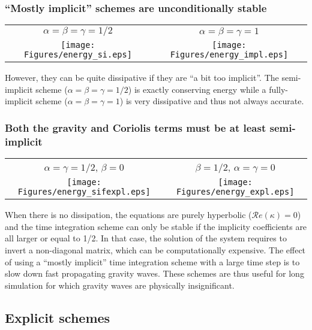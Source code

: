 \subsubsection{``Mostly implicit'' schemes are unconditionally stable}

\begin{center}
	\begin{tabular}{cc}
		$\alpha = \beta = \gamma = 1/2$  & $\alpha = \beta = \gamma = 1$ \\
		\texttt{[image: Figures/energy\_si.eps]}
		&
		\texttt{[image: Figures/energy\_impl.eps]}
	\end{tabular}
\end{center}
However, they can be quite dissipative if they are ``a bit too implicit''. The semi-implicit scheme ($\alpha = \beta = \gamma = 1/2$) is exactly conserving energy while a fully-implicit scheme ($\alpha = \beta = \gamma = 1$) is very dissipative and thus not always accurate.


\subsubsection{Both the gravity and Coriolis terms must be at least semi-implicit}

\begin{center}
	\begin{tabular}{cc}
		$\alpha = \gamma = 1/2$, $\beta=0$  & $\beta = 1/2$, $\alpha = \gamma = 0$ \\
		\texttt{[image: Figures/energy\_sifexpl.eps]}
		&
		\texttt{[image: Figures/energy\_expl.eps]}
	\end{tabular}
\end{center}


When there is no dissipation, the equations are purely hyperbolic ($\mathcal{R}e(\kappa) = 0$) and the time integration scheme can only be stable if the implicity coefficients are all larger or equal to 1/2. In that case, the solution of the system requires to invert a non-diagonal matrix, which can be computationally expensive. The effect of using a ``mostly implicit'' time integration scheme with a large time step is to slow down fast propagating gravity waves. These schemes are thus useful for long simulation for which gravity waves are physically insignificant.


\subsection{Explicit schemes}
